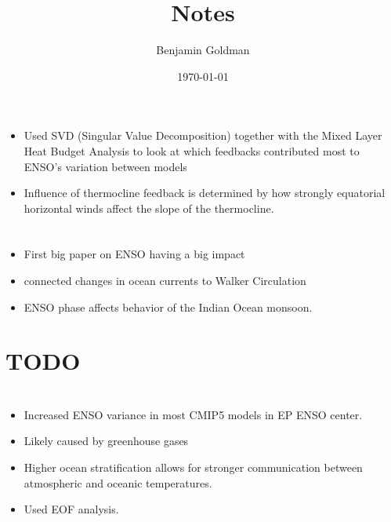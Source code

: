 \documentclass[11pt]{article}
\author{Benjamin Goldman}
\date{\today}
\title{Notes}
\begin{document}
\maketitle
\tableofcontents



\section{\cite{an2017feedback}}
\label{sec:org87b42f5}

\begin{itemize}
\item Used SVD (Singular Value Decomposition) together with the Mixed Layer Heat Budget Analysis to look at which feedbacks contributed most to ENSO's variation between models
\item Influence of thermocline feedback is determined by how strongly equatorial horizontal winds affect the slope of the thermocline.
\end{itemize}

\section{\cite{bjerknes1969atmospheric}}
\label{sec:org7b6b0b3}

\begin{itemize}
\item First big paper on ENSO having a big impact
\item connected changes in ocean currents to Walker Circulation
\item ENSO phase affects behavior of the Indian Ocean monsoon.
\end{itemize}

\section{{\bfseries\sffamily TODO} \cite{boer2000transient}}
\label{sec:org8596bf6}

\section{\cite{cai2018increased}}
\label{sec:org6b26555}

\begin{itemize}
\item Increased ENSO variance in most CMIP5 models in EP ENSO center.
\item Likely caused by greenhouse gases
\item Higher ocean stratification allows for stronger communication between atmospheric and oceanic temperatures.
\item Used EOF analysis.
\end{itemize}
\end{document}
